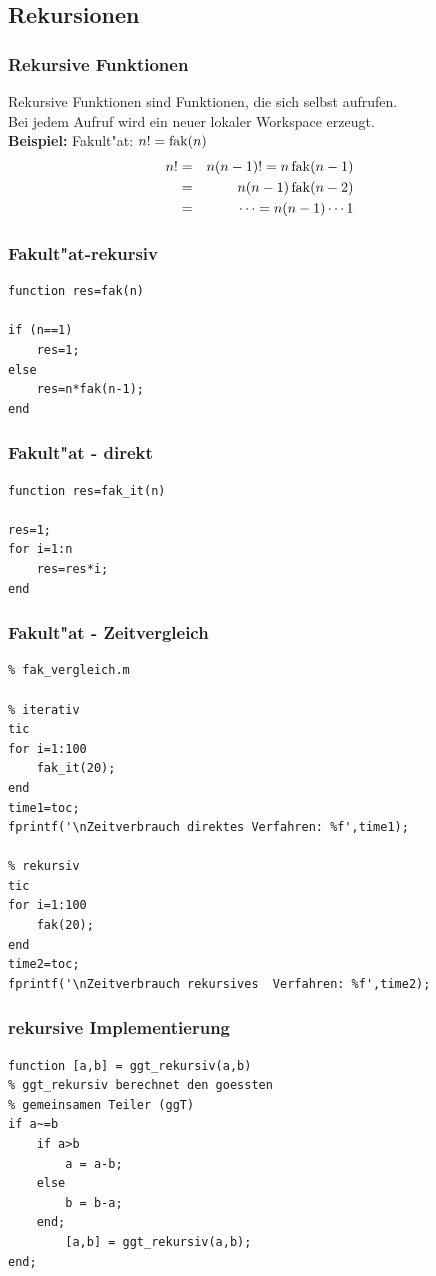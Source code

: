 \subsection{Rekursionen}
%
% 
\begin{frame}[fragile]\frametitle{Rekursive Funktionen}
Rekursive Funktionen sind Funktionen, die sich selbst aufrufen.\\
Bei jedem Aufruf wird ein neuer lokaler Workspace erzeugt.\\[1cm]

\textbf{Beispiel:} Fakult"at: $n!=\operatorname{fak}(n)$\\
\begin{eqnarray*}
 n!& = & n(n-1)!=n \operatorname{fak}(n-1)\\
& = & n(n-1)\operatorname{fak}(n-2)\\
& = & \cdots= n(n-1)\cdots 1 
\end{eqnarray*}
\end{frame}
%
%
\begin{frame}[fragile]\frametitle{Fakult"at-rekursiv}
\begin{lstlisting}
function res=fak(n)

if (n==1)
    res=1;
else 
    res=n*fak(n-1);
end
\end{lstlisting}
\end{frame}
%
%
\begin{frame}[fragile]\frametitle{Fakult"at - direkt}
\begin{lstlisting}
function res=fak_it(n)

res=1;
for i=1:n
    res=res*i;
end
\end{lstlisting}
\end{frame}
%
%
\begin{frame}[fragile]\frametitle{Fakult"at - Zeitvergleich}
\begin{lstlisting}
% fak_vergleich.m

% iterativ
tic
for i=1:100
    fak_it(20);
end
time1=toc;
fprintf('\nZeitverbrauch direktes Verfahren: %f',time1);

% rekursiv
tic
for i=1:100
    fak(20);
end
time2=toc;
fprintf('\nZeitverbrauch rekursives  Verfahren: %f',time2);
\end{lstlisting}
\end{frame}
%
%
\begin{frame}[fragile]\frametitle{rekursive Implementierung}

\begin{lstlisting}
function [a,b] = ggt_rekursiv(a,b)
% ggt_rekursiv berechnet den goessten 
% gemeinsamen Teiler (ggT) 
if a~=b
    if a>b
        a = a-b;
    else
        b = b-a;
    end;
        [a,b] = ggt_rekursiv(a,b);
end;
\end{lstlisting}
\end{frame}
